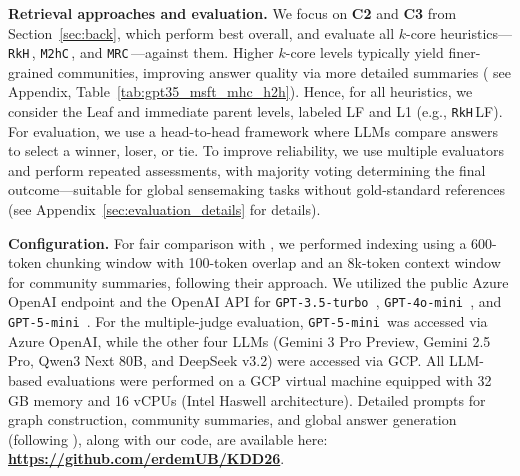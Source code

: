 \documentclass[sigconf]{acmart}
\newcommand{\KHC}{\texttt{RkH}\,}
\newcommand{\MHC}{\texttt{M2hC}\,}
\newcommand{\MRC}{\texttt{MRC}\,}
\newcommand{\threepointfive}{\texttt{GPT-3.5-turbo\,}}
\newcommand{\four}{\texttt{GPT-4o-mini\,}}
\newcommand{\five}{\texttt{GPT-5-mini\,}}
\begin{document}
\textbf{Retrieval approaches and evaluation.}   \label{sec:evaluation_method}
We focus on \textbf{C2} and \textbf{C3} from Section~\ref{sec:back}, which perform best overall, and evaluate all $k$-core heuristics—\KHC, \MHC, and \MRC—against them. 
Higher $k$-core levels typically yield finer-grained communities, improving answer quality via more detailed summaries (%
see Appendix, Table~\ref{tab:gpt35_msft_mhc_h2h}). Hence, for all heuristics, we consider the Leaf and immediate parent levels, labeled LF and L1 (e.g., \KHC LF).  
For evaluation, we use a head-to-head framework where LLMs compare answers to select a winner, loser, or tie. To improve reliability, we use multiple evaluators and perform repeated assessments, with majority voting determining the final outcome—suitable for global sensemaking tasks without gold-standard references (see Appendix~\ref{sec:evaluation_details} for details).


\textbf{Configuration.}
For fair comparison with \cite{edge24}, we performed indexing using a 600-token chunking window with 100-token overlap and an 8k-token context window for community summaries, following their approach.
We utilized the public Azure OpenAI endpoint and the OpenAI API for \threepointfive, \four, and \five. For the multiple-judge evaluation, \five was accessed via Azure OpenAI, while the other four LLMs (Gemini 3 Pro Preview, Gemini 2.5 Pro, Qwen3 Next 80B, and DeepSeek v3.2) were accessed via GCP.  
All LLM-based evaluations were performed on a GCP virtual machine equipped with 32 GB memory and 16 vCPUs (Intel Haswell architecture).
Detailed prompts for graph construction, community summaries, and global answer generation (following \cite{edge24}), along with our code, are available here: \textbf{\href{https://github.com/erdemUB/KDD26}{https://github.com/erdemUB/KDD26}}.
\end{document}
